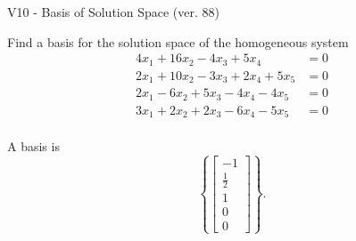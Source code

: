 \begin{exercise}
  \begin{exerciseTitle}V10 - Basis of Solution Space (ver. 88)\end{exerciseTitle}
  \begin{exerciseStatement}
    Find a basis for the solution space of the homogeneous system 
\begin{align*}
 4 x_ 1 + 16 x_ 2 -4 x_ 3 + 5 x_ 4 &= 0  \\ 
  2 x_ 1 + 10 x_ 2 -3 x_ 3 + 2 x_ 4 + 5 x_ 5 &= 0  \\ 
  2 x_ 1 -6 x_ 2 + 5 x_ 3 -4 x_ 4 -4 x_ 5 &= 0  \\ 
  3 x_ 1 + 2 x_ 2 + 2 x_ 3 -6 x_ 4 -5 x_ 5 &= 0  \\ 
 \end{align*}


 
  \end{exerciseStatement}

  \begin{exerciseAnswer}
   A basis is   
\[\left\{\left[\begin{array}{c}
-1 \\
\frac{1}{2} \\
1 \\
0 \\
0
\end{array}\right]\right\}.\]

  


  \end{exerciseAnswer}
\end{exercise}